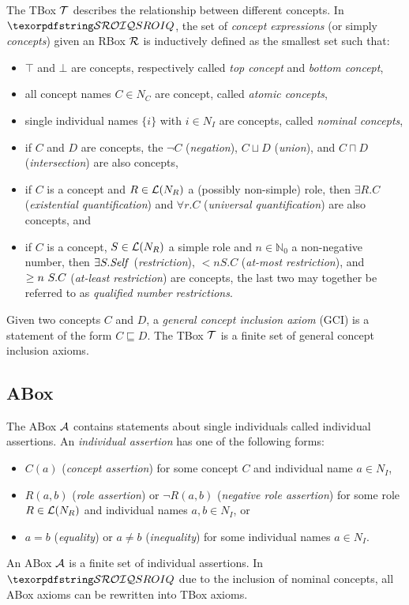 The TBox $\mathcal{T}$ describes the relationship between different concepts. In $\SROIQ$, the set of \emph{concept expressions} (or simply \emph{concepts}) given an RBox $\mathcal{R}$ is inductively defined as the smallest set such that:
\begin{itemize}
  \item $\top$ and $\bot$ are concepts, respectively called \emph{top concept} and \emph{bottom concept},
  \item all concept names $C \in N_C$ are concept, called \emph{atomic concepts},
  \item single individual names $\{ i \}$ with $i \in N_I$ are concepts, called \emph{nominal concepts},
  \item if $C$ and $D$ are concepts, the $\lnot C$ (\emph{negation}), $C \sqcup D$ (\emph{union}), and $C \sqcap D$ (\emph{intersection}) are also concepts,
  \item if $C$ is a concept and $R \in \mathcal{L}(N_R)$ a (possibly non-simple) role, then $\exists R.C$ (\emph{existential quantification}) and $\forall r.C$ (\emph{universal quantification}) are also concepts, and
  \item if $C$ is a concept, $S \in \mathcal{L}(N_R)$ a simple role and $n \in \mathbb{N}_0$ a non-negative number, then $\exists S.\mathit{Self}$ (\emph{\self restriction}), $\less n S.C$ (\emph{at-most restriction}), and $\geq n~S.C$ (\emph{at-least restriction}) are concepts, the last two may together be referred to as \emph{qualified number restrictions}.
\end{itemize}
Given two concepts $C$ and $D$, a \emph{general concept inclusion axiom} (GCI) is a statement of the form $C \sqsubseteq D$. The TBox $\mathcal{T}$ is a finite set of general concept inclusion axioms.

\subsection{ABox} \label{abox}

The ABox $\mathcal{A}$ contains statements about single individuals called individual assertions. An \emph{individual assertion} has one of the following forms:
\begin{itemize}
  \item $C(a)$ (\emph{concept assertion}) for some concept $C$ and individual name $a \in N_I$,
  \item $R(a, b)$ (\emph{role assertion}) or $\lnot R(a, b)$ (\emph{negative role assertion}) for some role $R \in \mathcal{L}(N_R)$ and individual names $a, b \in N_I$, or
  \item $a = b$ (\emph{equality}) or $a \not = b$ (\emph{inequality}) for some individual names $a \in N_I$.
\end{itemize}
An ABox $\mathcal{A}$ is a finite set of individual assertions. In $\SROIQ$ due to the inclusion of nominal concepts, all ABox axioms can be rewritten into TBox axioms.
